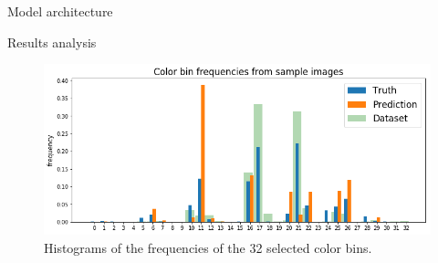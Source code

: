 \documentclass[final]{beamer}
\newlength{\onecolwid}
\begin{document}
\begin{frame}[t]
\begin{columns}[t]
\begin{column}{\onecolwid}
\begin{block}{Model architecture}
\end{block}






\begin{block}{Results analysis}


\begin{figure}
\begin{center}
\includegraphics[width=\linewidth]{histogram_compact}
\caption{Histograms of the frequencies of the 32 selected color bins.}
\label{histogram}
\end{center}
\end{figure}



\end{block}


\end{column}
\end{columns}
\end{frame}
\end{document}
